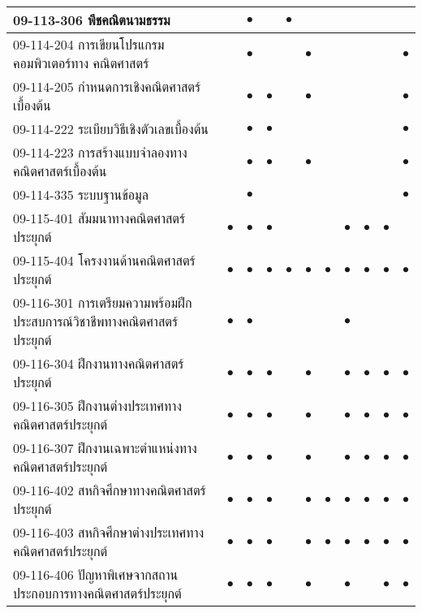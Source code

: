 \begin{longtable}{|>{\raggedright}p{}|c|c|c|c|c|c|c|c|c|c|}
	\hline
	09-113-306 พีชคณิตนามธรรม&&{\Large$\bullet$}&&{\Large$\bullet$}&&&&&&\\
	\hline
	09-114-204 การเขียนโปรแกรมคอมพิวเตอร์ทาง
	คณิตศาสตร์&&{\Large$\bullet$}&&&{\Large$\bullet$}&&&&&{\Large$\bullet$}\\
	\hline
	09-114-205 กำหนดการเชิงคณิตศาสตร์เบื้องต้น&&{\Large$\bullet$}&{\Large$\bullet$}&&{\Large$\bullet$}&&&&&{\Large$\bullet$}\\
	\hline
	09-114-222 ระเบียบวิธีเชิงตัวเลขเบื้องต้น&&{\Large$\bullet$}&{\Large$\bullet$}&&&&&&&{\Large$\bullet$}\\
	\hline
	09-114-223 การสร้างแบบจำลองทางคณิตศาสตร์เบื้องต้น&&{\Large$\bullet$}&{\Large$\bullet$}&&{\Large$\bullet$}&&&&&{\Large$\bullet$}\\
	\hline
	09-114-335 ระบบฐานข้อมูล&&{\Large$\bullet$}&&&&&&&&{\Large$\bullet$}\\
	\hline
	09-115-401 สัมมนาทางคณิตศาสตร์ประยุกต์&{\Large$\bullet$}&{\Large$\bullet$}&{\Large$\bullet$}&&&&{\Large$\bullet$}&{\Large$\bullet$}&{\Large$\bullet$}&\\
	\hline
	09-115-404 โครงงานด้านคณิตศาสตร์ประยุกต์&{\Large$\bullet$}&{\Large$\bullet$}&{\Large$\bullet$}&{\Large$\bullet$}&{\Large$\bullet$}&{\Large$\bullet$}&{\Large$\bullet$}&{\Large$\bullet$}&{\Large$\bullet$}&{\Large$\bullet$}\\
	\hline
	09-116-301 การเตรียมความพร้อมฝึกประสบการณ์วิชาชีพทางคณิตศาสตร์ประยุกต์ &{\Large$\bullet$}&{\Large$\bullet$}& & & & & {\Large$\bullet$} & & & \\
	\hline
	09-116-304 ฝึกงานทางคณิตศาสตร์ประยุกต์ &{\Large$\bullet$}&{\Large$\bullet$}&{\Large$\bullet$}& &{\Large$\bullet$}& &{\Large$\bullet$}&{\Large$\bullet$}&{\Large$\bullet$}&{\Large$\bullet$}\\
	\hline
    09-116-305 ฝึกงานต่างประเทศทางคณิตศาสตร์ประยุกต์ &{\Large$\bullet$}&{\Large$\bullet$}&{\Large$\bullet$}& &{\Large$\bullet$}& &{\Large$\bullet$}&{\Large$\bullet$}&{\Large$\bullet$}&{\Large$\bullet$}\\
	\hline
	09-116-307 ฝึกงานเฉพาะตำแหน่งทางคณิตศาสตร์ประยุกต์ &{\Large$\bullet$}&{\Large$\bullet$}&{\Large$\bullet$}& &{\Large$\bullet$}& &{\Large$\bullet$}&{\Large$\bullet$}&{\Large$\bullet$}&{\Large$\bullet$}\\
	\hline
	09-116-402 สหกิจศึกษาทางคณิตศาสตร์ประยุกต์ &{\Large$\bullet$}&{\Large$\bullet$}&{\Large$\bullet$}& &{\Large$\bullet$}&{\Large$\bullet$}&{\Large$\bullet$}&{\Large$\bullet$}&{\Large$\bullet$}&{\Large$\bullet$}\\
	\hline
	09-116-403 สหกิจศึกษาต่างประเทศทางคณิตศาสตร์ประยุกต์ &{\Large$\bullet$}&{\Large$\bullet$}&{\Large$\bullet$}& &{\Large$\bullet$}&{\Large$\bullet$}&{\Large$\bullet$}&{\Large$\bullet$}&{\Large$\bullet$}&{\Large$\bullet$}\\
	\hline
	09-116-406 ปัญหาพิเศษจากสถานประกอบการทางคณิตศาสตร์ประยุกต์ &{\Large$\bullet$}&{\Large$\bullet$}&{\Large$\bullet$}& &{\Large$\bullet$}& &{\Large$\bullet$}& &{\Large$\bullet$}&{\Large$\bullet$}\\
	\hline
		\end{longtable}
	
